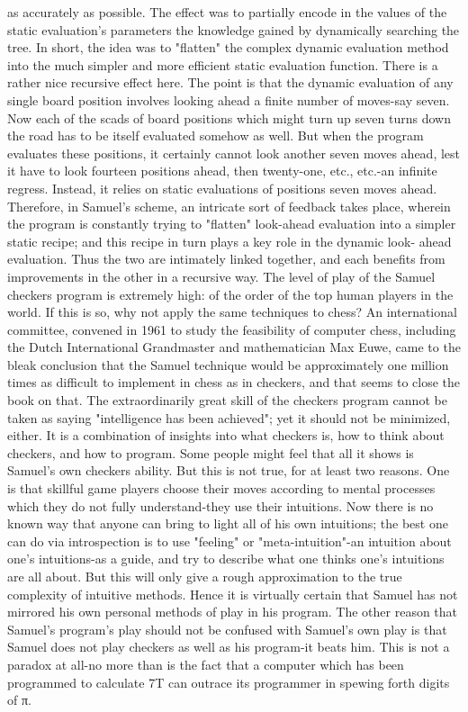{   as accurately as possible. The effect was to partially encode in the values of the
   static evaluation’s parameters the knowledge gained by dynamically searching the
   tree. In short, the idea was to "flatten" the complex dynamic evaluation method into
   the much simpler and more efficient static evaluation function.
        There is a rather nice recursive effect here. The point is that the dynamic
   evaluation of any single board position involves looking ahead a finite number of
   moves-say seven. Now each of the scads of board positions which might turn up
   seven turns down the road has to be itself evaluated somehow as well. But when the
   program evaluates these positions, it certainly cannot look another seven moves
   ahead, lest it have to look fourteen positions ahead, then twenty-one, etc., etc.-an
   infinite regress. Instead, it relies on static evaluations of positions seven moves
   ahead. Therefore, in Samuel's scheme, an intricate sort of feedback takes place,
   wherein the program is constantly trying to "flatten" look-ahead evaluation into a
   simpler static recipe; and this recipe in turn plays a key role in the dynamic look-
   ahead evaluation. Thus the two are intimately linked together, and each benefits
   from improvements in the other in a recursive way.
        The level of play of the Samuel checkers program is extremely high: of the
   order of the top human players in the world. If this is so, why not apply the same
   techniques to chess? An international committee, convened in 1961 to study the
   feasibility of computer chess, including the Dutch International Grandmaster and
   mathematician Max Euwe, came to the bleak conclusion that the Samuel technique
   would be approximately one million times as difficult to implement in chess as in
   checkers, and that seems to close the book on that.
        The extraordinarily great skill of the checkers program cannot be taken as
   saying "intelligence has been achieved"; yet it should not be minimized, either. It is
   a combination of insights into what checkers is, how to think about checkers, and
   how to program. Some people might feel that all it shows is Samuel's own checkers
   ability. But this is not true, for at least two reasons. One is that skillful game players
   choose their moves according to mental processes which they do not fully
   understand-they use their intuitions. Now there is no known way that anyone can
   bring to light all of his own intuitions; the best one can do via introspection is to
   use "feeling" or "meta-intuition"-an intuition about one's intuitions-as a guide, and
   try to describe what one thinks one's intuitions are all about. But this will only give
   a rough approximation to the true complexity of intuitive methods. Hence it is
   virtually certain that Samuel has not mirrored his own personal methods of play in
   his program. The other reason that Samuel's program's play should not be confused
   with Samuel's own play is that Samuel does not play checkers as well as his
   program-it beats him. This is not a paradox at all-no more than is the fact that a
   computer which has been programmed to calculate 7T can outrace its programmer
   in spewing forth digits of π.




}
